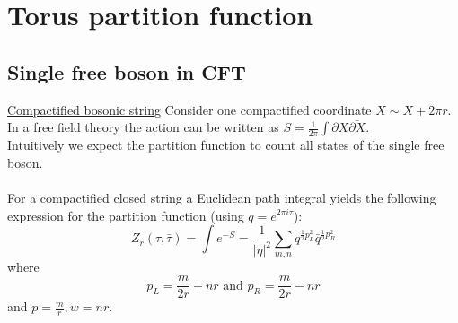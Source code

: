 \documentclass[11pt,aspectratio=169]{beamer}
\begin{document}
\section{Torus partition function}



\subsection{Single free boson in CFT}


\begin{frame}{\underline{Compactified bosonic string}}
	Consider one compactified coordinate $X \sim X + 2\pi r$. In a free field theory the action can be written as 
	$S = \frac{1}{2\pi}\int \partial X \bar{\partial X}$.
	\\
	Intuitively we expect the partition function to count all states of the single free boson.
	\\~\\
	For a compactified closed string a Euclidean path integral yields the following expression for the partition function (using $q = e^{2\pi i \tau}$):
	\begin{equation}
		Z_r (\tau, \bar{\tau}) = \int e^{-S} = \frac{1}{|\eta|^2} \sum_{m, n} q^{\frac{1}{2}p_L^2}\bar{q}^{\frac{1}{2}p_R^2}
	\end{equation}
	where
	\begin{equation}
		p_L = \frac{m}{2r} + nr \textrm{ and }
		p_R = \frac{m}{2r} - nr
	\end{equation}
	and $p = \frac{m}{r}, w = nr$.

\end{frame}
\end{document}
